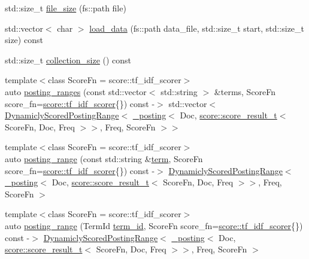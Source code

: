 \begin{DoxyCompactItemize}
\item 
std\+::size\+\_\+t \mbox{\hyperlink{classirk_1_1Index_a514310770dbffbe7df62fd66e2dfb928}{file\+\_\+size}} (fs\+::path file)
\item 
std\+::vector$<$ char $>$ \mbox{\hyperlink{classirk_1_1Index_afc5fbee8ec5fb126ba8eac0d88baf486}{load\+\_\+data}} (fs\+::path data\+\_\+file, std\+::size\+\_\+t start, std\+::size\+\_\+t size) const
\item 
std\+::size\+\_\+t \mbox{\hyperlink{classirk_1_1Index_ace64d8d68e3c97a790747bd65a17a6b4}{collection\+\_\+size}} () const
\item 
{\footnotesize template$<$class Score\+Fn  = score\+::tf\+\_\+idf\+\_\+scorer$>$ }\\auto \mbox{\hyperlink{classirk_1_1Index_a4ccbee8e961b0e219ab424f7ddc9301b}{posting\+\_\+ranges}} (const std\+::vector$<$ std\+::string $>$ \&terms, Score\+Fn score\+\_\+fn=\mbox{\hyperlink{structirk_1_1score_1_1tf__idf__scorer}{score\+::tf\+\_\+idf\+\_\+scorer}}\{\}) const -\/$>$ std\+::vector$<$ \mbox{\hyperlink{classirk_1_1DynamiclyScoredPostingRange}{Dynamicly\+Scored\+Posting\+Range}}$<$ \mbox{\hyperlink{structirk_1_1__posting}{\+\_\+posting}}$<$ Doc, \mbox{\hyperlink{namespaceirk_1_1score_af4a2c84b3548a4ac12aac3862bc94875}{score\+::score\+\_\+result\+\_\+t}}$<$ Score\+Fn, Doc, Freq $>$$>$, Freq, Score\+Fn $>$$>$
\item 
{\footnotesize template$<$class Score\+Fn  = score\+::tf\+\_\+idf\+\_\+scorer$>$ }\\auto \mbox{\hyperlink{classirk_1_1Index_ab838e29ef2f14dd506878730e00ee800}{posting\+\_\+range}} (const std\+::string \&\mbox{\hyperlink{classirk_1_1Index_a359813adc185edff595b8adbd743a21c}{term}}, Score\+Fn score\+\_\+fn=\mbox{\hyperlink{structirk_1_1score_1_1tf__idf__scorer}{score\+::tf\+\_\+idf\+\_\+scorer}}\{\}) const -\/$>$ \mbox{\hyperlink{classirk_1_1DynamiclyScoredPostingRange}{Dynamicly\+Scored\+Posting\+Range}}$<$ \mbox{\hyperlink{structirk_1_1__posting}{\+\_\+posting}}$<$ Doc, \mbox{\hyperlink{namespaceirk_1_1score_af4a2c84b3548a4ac12aac3862bc94875}{score\+::score\+\_\+result\+\_\+t}}$<$ Score\+Fn, Doc, Freq $>$$>$, Freq, Score\+Fn $>$
\item 
{\footnotesize template$<$class Score\+Fn  = score\+::tf\+\_\+idf\+\_\+scorer$>$ }\\auto \mbox{\hyperlink{classirk_1_1Index_ac777d1db0267b0e6191700e91a8eafa3}{posting\+\_\+range}} (Term\+Id \mbox{\hyperlink{classirk_1_1Index_adf03f14a502c40a0428ec9cc9f638a68}{term\+\_\+id}}, Score\+Fn score\+\_\+fn=\mbox{\hyperlink{structirk_1_1score_1_1tf__idf__scorer}{score\+::tf\+\_\+idf\+\_\+scorer}}\{\}) const -\/$>$ \mbox{\hyperlink{classirk_1_1DynamiclyScoredPostingRange}{Dynamicly\+Scored\+Posting\+Range}}$<$ \mbox{\hyperlink{structirk_1_1__posting}{\+\_\+posting}}$<$ Doc, \mbox{\hyperlink{namespaceirk_1_1score_af4a2c84b3548a4ac12aac3862bc94875}{score\+::score\+\_\+result\+\_\+t}}$<$ Score\+Fn, Doc, Freq $>$$>$, Freq, Score\+Fn $>$

\end{DoxyCompactItemize}
